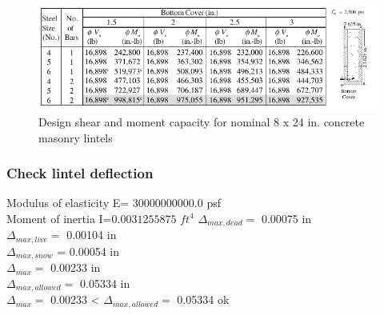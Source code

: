 \begin{figure}
  \begin{center}
  \includegraphics[width=120mm]{results_lintels/lintels_figures/blocks_8_24}
  \end{center}
  \caption{Design shear and moment capacity for nominal 8 x 24 in. concrete masonry lintels}\label{8_24}
\end{figure}

\subsubsection{Check lintel deflection}
Modulus of elasticity E=  30000000000.0  psf \\
Moment of inertia I=$  0.0031255875$ $ft^4$
$\Delta_{max,dead} =$  0.00075  in \\
$\Delta_{max,live} =$  0.00104  in \\
$\Delta_{max,snow}$ =  0.00054  in \\
$\Delta_{max} =$  0.00233  in \\
$\Delta_{max,allowed} =$  0.05334  in \\
$\Delta_{max} =$  0.00233  < $\Delta_{max,allowed} =$  0.05334  ok \\

